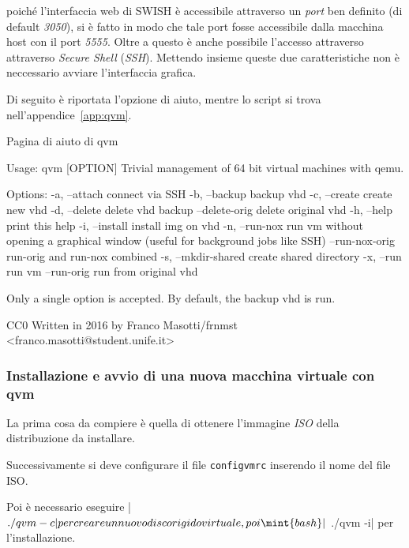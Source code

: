 \documentclass[10pt,titlepage,twoside,a4paper]{report}
\newenvironment{code}{\singlespacing\captionsetup{type=listing}}{}
\begin{document}
poiché l'interfaccia web di SWISH è accessibile attraverso un \emph{port} 
ben definito (di default \emph{3050}), si è fatto in modo che tale port 
fosse accessibile dalla macchina host con il port \emph{5555}. Oltre a questo 
è anche possibile l'accesso attraverso attraverso \emph{Secure 
Shell} (\emph{SSH}). Mettendo insieme queste due caratteristiche non è 
neccessario avviare l'interfaccia grafica.

Di seguito è riportata l'opzione di aiuto, mentre lo script si trova 
nell'appendice~\ref{app:qvm}.

\begin{code}
    \caption{Pagina di aiuto di qvm}
    \begin{textcode*}{}
Usage: qvm [OPTION]
Trivial management of 64 bit virtual machines with qemu.

Options:
    -a, --attach                connect via SSH
    -b, --backup                backup vhd
    -c, --create                create new vhd
    -d, --delete                delete vhd backup
        --delete-orig           delete original vhd
    -h, --help                  print this help
    -i, --install               install img on vhd
    -n, --run-nox               run vm without opening a graphical window
                                (useful for background jobs like SSH)
        --run-nox-orig          run-orig and run-nox combined
    -s, --mkdir-shared          create shared directory
    -x, --run                   run vm
        --run-orig              run from original vhd


Only a single option is accepted.
By default, the backup vhd is run.

CC0
Written in 2016 by Franco Masotti/frnmst <franco.masotti@student.unife.it>
    \end{textcode*}
\end{code}

\subsubsection{Installazione e avvio di una nuova macchina virtuale con qvm}
La prima cosa da compiere è quella di ottenere l'immagine \emph{ISO} della 
distribuzione da installare.

Successivamente si deve configurare il file \texttt{configvmrc} inserendo il 
nome del file ISO.

Poi è necessario eseguire |$ ./qvm -c| per creare un nuovo 
disco rigido virtuale, poi \mint{bash}|$ ./qvm -i| per l'installazione.
\end{document}
